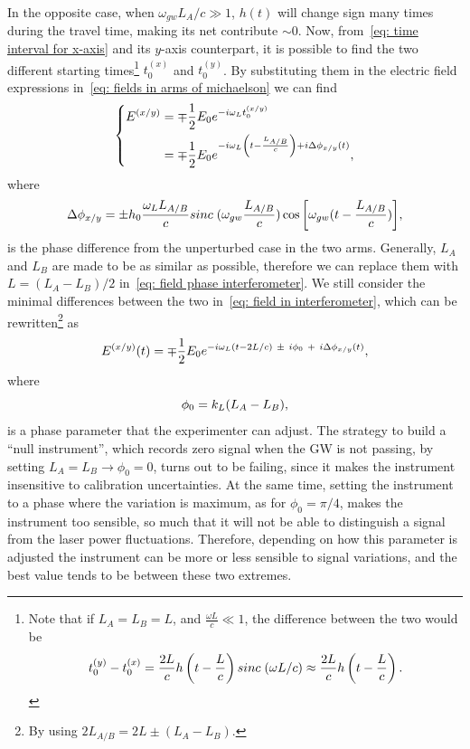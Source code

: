 In the opposite case, when $\omega_{gw}L_A/c \gg 1$, $h(t)$ will change sign many times during the travel time, making its net contribute $\sim0$.
Now, from~\eqref{eq: time interval for x-axis} and its $y$-axis counterpart, it is possible to find the two different starting times\footnote{Note that if $L_A=L_B=L$, and $\frac{\omega L}{c}\ll 1$, the difference between the two would be
\[
    t_0^{(y)} - t_0^{(x)} = \frac{2L}{c} h\left(t-\frac{L}{c}\right)sinc\hspace{1mm}(\omega L/c)\approx \frac{2L}{c}h\left(t-\frac{L}{c}\right).
\]}
$t_0^{(x)}$ and $t_0^{(y)}$. 
By substituting them in the electric field expressions in~\eqref{eq: fields in arms of michaelson} we can find
\begin{equation}
    \left\{
        \begin{aligned}
            E^{(x/y)} &= \mp\frac{1}{2}E_0e^{-i\omega_L t_0^{(x/y)}} \\
            \vspace{1mm}
                      &= \mp\frac{1}{2}E_0e^{-i\omega_L \left(t-\frac{L_{A/B}}{c}\right)+i\Delta\phi_{x/y}(t)},
        \end{aligned}
    \right.
    \label{eq: field in interferometer}
\end{equation}
where
\begin{equation}
    \Delta\phi_{x/y}= \pm h_0 \frac{\omega_L L_{A/B}}{c} sinc\hspace{1mm}(\omega_{gw}\frac{L_{A/B}}{c})\cos{\left[ \omega_{gw}(t - \frac{L_{A/B}}{c}) \right]},
    \label{eq: field phase interferometer}
\end{equation}
is the phase difference from the unperturbed case in the two arms.
Generally, $L_A$ and $L_B$ are made to be as similar as possible, therefore we can replace them with $L=(L_A - L_B)/2$ in~\eqref{eq: field phase interferometer}. 
We still consider the minimal differences between the two in~\eqref{eq: field in interferometer}, which can be rewritten\footnote{By using $2L_{A/B} = 2L \pm (L_A - L_B)$.} as 
\begin{equation*}
    E^{(x/y)}(t) = \mp \frac{1}{2}E_0 e^{-i\omega_L(t-2L/c)~\pm~i\phi_0~+~i\Delta\phi_{x/y}(t)},
    \notag
\end{equation*}
where
\begin{equation}
    \phi_0 = k_L(L_A - L_B),
    \notag
\end{equation}
is a phase parameter that the experimenter can adjust.
The strategy to build a ``null instrument'', which records zero signal when the GW is not passing, by setting $L_A = L_B \to \phi_0=0$, turns out to be failing, since it makes the instrument insensitive to calibration uncertainties.
At the same time, setting the instrument to a phase where the variation is maximum, as for $\phi_0=\pi/4$, makes the instrument too sensible, so much that it will not be able to distinguish a signal from the laser power fluctuations.
Therefore, depending on how this parameter is adjusted the instrument can be more or less sensible to signal variations, and the best value tends to be between these two extremes.

